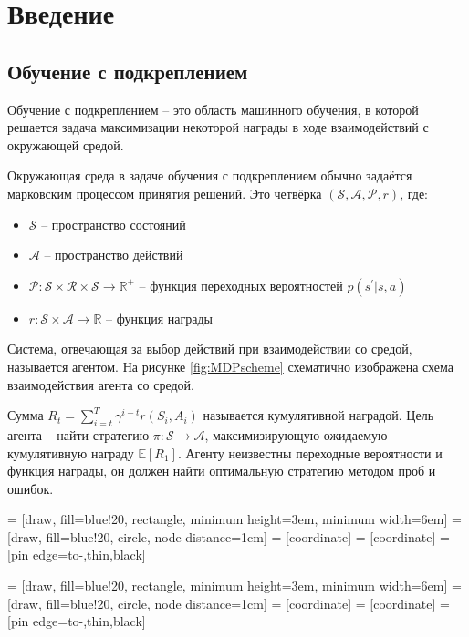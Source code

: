 \documentclass[a4paper, 12pt]{article}
\begin{document}
\newpage
\section{Введение}

\subsection{Обучение с подкреплением}

Обучение с подкреплением -- это область машинного обучения,  в которой решается задача максимизации некоторой награды в ходе взаимодействий с окружающей средой. 

Окружающая среда в задаче обучения с подкреплением обычно задаётся марковским процессом принятия решений.
Это четвёрка $\left(\mathcal{S}, \mathcal{A}, \mathcal{P}, r\right)$, где:

\begin{itemize}
\item $\mathcal{S}$ -- пространство состояний
\item $\mathcal{A}$ -- пространство действий
\item $\mathcal{P}: \mathcal{S} \times \mathcal{R} \times \mathcal{S} \rightarrow \mathbb{R}^+$ -- функция переходных вероятностей $p\left(s^{\prime} | s, a\right)$
\item $r: \mathcal{ S } \times \mathcal { A } \rightarrow \mathbb{R}$ -- функция награды
\end{itemize} 
Система, отвечающая за выбор действий при взаимодействии со средой, называется агентом.  На рисунке \ref{fig:MDPscheme}  схематично изображена схема взаимодействия агента со средой. 

Сумма $R_{t}=\sum_{i=t}^{T} \gamma^{i-t} r\left(S_{i}, A_{i}\right)$ называется кумулятивной наградой.
Цель агента -- найти стратегию $\pi: \mathcal{S} \rightarrow \mathcal{A}$, максимизирующую ожидаемую кумулятивную награду $\mathbb{E}\left[R_1\right]$. Агенту неизвестны переходные вероятности и функция награды, он должен найти оптимальную стратегию методом проб и ошибок. 

 = [draw, fill=blue!20, rectangle, 
    minimum height=3em, minimum width=6em]
 = [draw, fill=blue!20, circle, node distance=1cm]
 = [coordinate]
 = [coordinate]
 = [pin edge={to-,thin,black}]
%

 = [draw, fill=blue!20, rectangle, 
    minimum height=3em, minimum width=6em]
 = [draw, fill=blue!20, circle, node distance=1cm]
 = [coordinate]
 = [coordinate]
 = [pin edge={to-,thin,black}]
\end{document}
